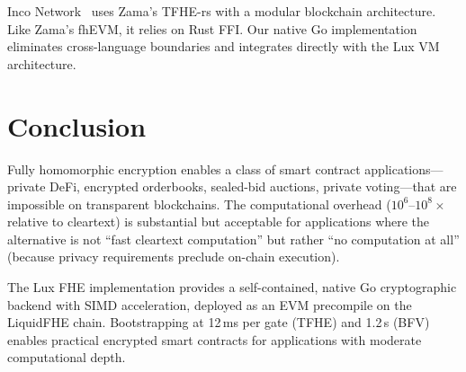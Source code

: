 \documentclass[11pt,a4paper]{article}
\begin{document}
Inco Network~\cite{inco2024} uses Zama's TFHE-rs with a modular blockchain
architecture. Like Zama's fhEVM, it relies on Rust FFI. Our native Go implementation
eliminates cross-language boundaries and integrates directly with the Lux VM
architecture.

\section{Conclusion}

Fully homomorphic encryption enables a class of smart contract applications---private
DeFi, encrypted orderbooks, sealed-bid auctions, private voting---that are impossible
on transparent blockchains. The computational overhead ($10^6$--$10^8\times$ relative
to cleartext) is substantial but acceptable for applications where the alternative is
not ``fast cleartext computation'' but rather ``no computation at all'' (because
privacy requirements preclude on-chain execution).

The Lux FHE implementation provides a self-contained, native Go cryptographic backend
with SIMD acceleration, deployed as an EVM precompile on the LiquidFHE chain.
Bootstrapping at 12\,ms per gate (TFHE) and 1.2\,s (BFV) enables practical encrypted
smart contracts for applications with moderate computational depth.
\end{document}
